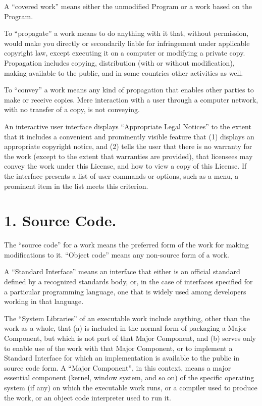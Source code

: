 \documentclass[11pt,a4paper]{article}
\begin{document}
A “covered work” means either the unmodified Program or a work based on
the Program.

To “propagate” a work means to do anything with it that, without
permission, would make you directly or secondarily liable for
infringement under applicable copyright law, except executing it on a
computer or modifying a private copy. Propagation includes copying,
distribution (with or without modification), making available to the
public, and in some countries other activities as well.

To “convey” a work means any kind of propagation that enables other
parties to make or receive copies. Mere interaction with a user through
a computer network, with no transfer of a copy, is not conveying.

An interactive user interface displays “Appropriate Legal Notices” to
the extent that it includes a convenient and prominently visible feature
that (1) displays an appropriate copyright notice, and (2) tells the
user that there is no warranty for the work (except to the extent that
warranties are provided), that licensees may convey the work under this
License, and how to view a copy of this License. If the interface
presents a list of user commands or options, such as a menu, a prominent
item in the list meets this criterion.

\part*{1. Source Code.}

The “source code” for a work means the preferred form of the work for
making modifications to it. “Object code” means any non-source form of a
work.

A “Standard Interface” means an interface that either is an official
standard defined by a recognized standards body, or, in the case of
interfaces specified for a particular programming language, one that is
widely used among developers working in that language.

The “System Libraries” of an executable work include anything, other
than the work as a whole, that (a) is included in the normal form of
packaging a Major Component, but which is not part of that Major
Component, and (b) serves only to enable use of the work with that Major
Component, or to implement a Standard Interface for which an
implementation is available to the public in source code form. A “Major
Component”, in this context, means a major essential component (kernel,
window system, and so on) of the specific operating system (if any) on
which the executable work runs, or a compiler used to produce the work,
or an object code interpreter used to run it.
\end{document}
